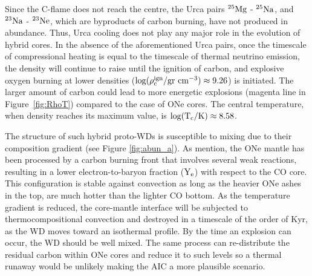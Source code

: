 \documentclass[../../main/thesis_msc.tex]{subfiles}
\begin{document}
        Since the C-flame does not reach the centre, the Urca pairs $\rm ^{25}Mg$ - $\rm ^{25}Na$, and $\rm ^{23}Na$ - $\rm ^{23}Ne$, which are byproducts of carbon burning, have not produced in abundance. Thus, Urca cooling does not play any major role in the evolution of hybrid cores. In the absence of the aforementioned Urca pairs, once the timescale of compressional heating is equal to the timescale of thermal neutrino emission, the density will continue to raise until the ignition of carbon, and explosive oxygen burning at lower densities ($\rm \log(\rho_c^{\rm ign} / \rm gr \ cm^{-3}) \approx 9.26$) is initiated. The larger amount of carbon could lead to more energetic explosions (magenta line in Figure\, \ref{fig:RhoT}) compared to the case of ONe cores. The central temperature, when density reaches its maximum value, is $\rm \log(T_c / \rm K) \approx 8.58$.
        
        The structure of such hybrid proto-WDs is susceptible to mixing due to their composition gradient (see Figure \ref{fig:abun_a}). As \cite{brooks2017} mention, the ONe mantle has been processed by a carbon burning front that involves several weak reactions, resulting in a lower electron-to-baryon fraction ($\rm Y_e$) with respect to the CO core. This configuration is stable against convection as long as the heavier ONe ashes in the top, are much hotter than the lighter CO bottom. As the temperature gradient is reduced, the core-mantle interface will be subjected to thermocompositional convection and destroyed in a timescale of the order of Kyr, as the WD moves toward an isothermal profile. By the time an explosion can occur, the WD should be well mixed. The same process can re-distribute the residual carbon within ONe cores and reduce it to such levels so a thermal runaway would be unlikely making the AIC a more plausible scenario.

    
    
\end{document}
